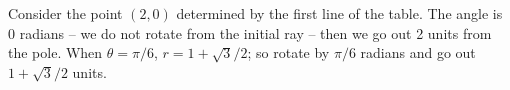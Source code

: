 {Consider the point $(2,0)$ determined by the first line of the table. The angle is 0 radians -- we do not rotate from the initial ray -- then we go out 2 units from the pole. When $\theta=\pi/6$, $r = 1+\sqrt{3}/2$; so rotate by $\pi/6$ radians and go out $1+\sqrt{3}/2$ units.}


